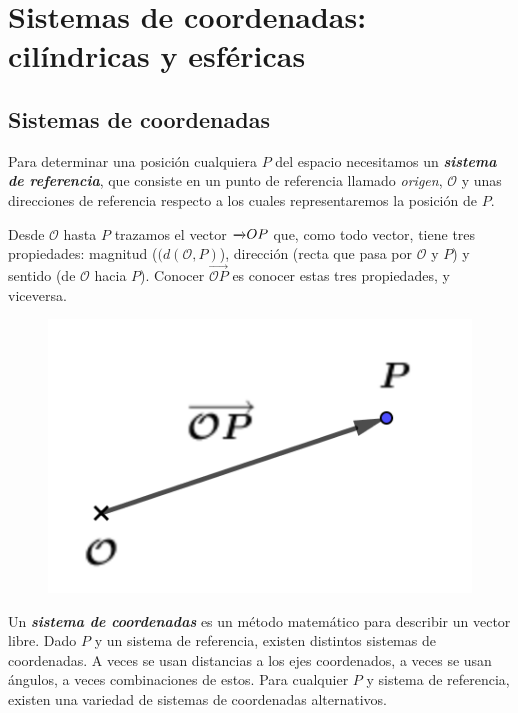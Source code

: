 \chapter{Sistemas de coordenadas: cilíndricas y esféricas}

\vspace{1cm}
\section{Sistemas de coordenadas}
\vspace{0.5cm}


Para determinar una posición cualquiera $P$ del espacio necesitamos un \emph{\textbf{sistema de referencia}}, que consiste en un punto de referencia llamado \emph{origen}, $\mathcal O$ y unas direcciones de referencia respecto a los cuales representaremos la posición de $P$.

\begin{multicols}{2}
Desde $\mathcal O$ hasta $P$ trazamos el vector $\overrightarrow \mathcal OP$ que, como todo vector, tiene tres propiedades:
magnitud ($(d(\mathcal O,P)$), dirección (recta que pasa por $\mathcal O$ y $P$) y sentido (de $\mathcal O$ hacia $P$). Conocer $\overrightarrow{ \mathcal OP}$ es conocer estas tres propiedades, y viceversa.
\begin{figure}[H]
	\centering
	\includegraphics[width=.25\textwidth]{img-coordenadas/coordenadas-01.png}
\end{figure}	
\end{multicols}

Un \emph{\textbf{sistema de coordenadas}} es un método matemático para describir un vector libre. Dado $P$ y un sistema de referencia, existen distintos sistemas de coordenadas. A veces se usan distancias a los ejes coordenados, a veces se usan ángulos, a veces combinaciones de estos. Para cualquier $P$ y sistema de referencia, existen una variedad de sistemas de coordenadas alternativos.

